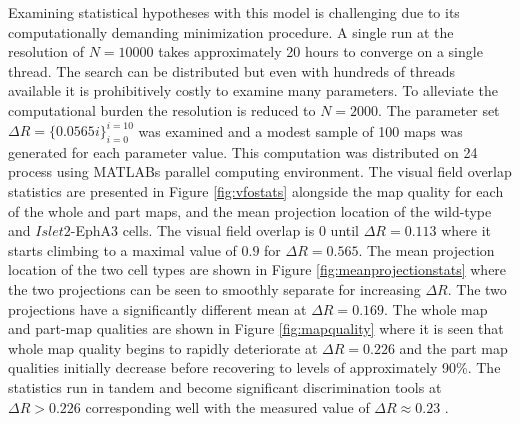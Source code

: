 Examining statistical hypotheses with this model is challenging due to its computationally demanding minimization procedure. A single run at the resolution of $N = 10000$ takes approximately 20 hours to converge on a single thread. The search can be distributed but even with hundreds of threads available it is prohibitively costly to examine many parameters. To alleviate the computational burden the resolution is reduced to $N = 2000$. The parameter set $\Delta R = \{0.0565 i\}_{i=0}^{i=10}$ was examined and  a modest sample of 100 maps was generated for each parameter value. This computation was distributed on 24 process using MATLABs parallel computing environment. The visual field overlap statistics are presented in Figure \ref{fig:vfostats} alongside the map quality for each of the whole and part maps, and the mean projection location of the wild-type and $Islet2$-EphA3 cells. The visual field overlap is 0 until $\Delta R = 0.113$ where it starts climbing to a maximal value of $0.9$ for $\Delta R = 0.565$. The mean projection location of the two cell types are shown in Figure \ref{fig:meanprojectionstats} where the two projections can be seen to smoothly separate for increasing $\Delta R$. The two projections have a significantly different mean at $\Delta R = 0.169$. The whole map and part-map qualities are shown in Figure \ref{fig:mapquality} where it is seen that whole map quality begins to rapidly deteriorate at $\Delta R = 0.226$ and the part map qualities initially decrease before recovering to levels of approximately 90\%. The statistics run in tandem and become significant discrimination tools at $\Delta R > 0.226$ corresponding well with the measured value of $\Delta R \approx 0.23$ \cite{Hjorth2015-le}. 

